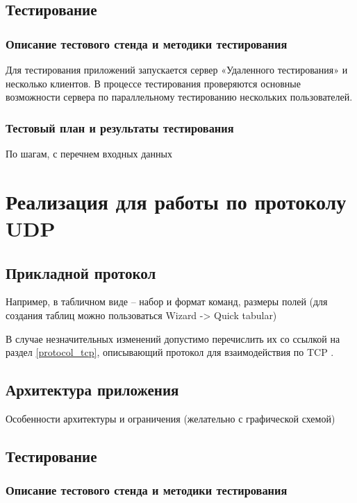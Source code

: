 \documentclass[12pt,a4paper]{report}
\begin{document}
\section{Тестирование}
\subsection{Описание тестового стенда и методики тестирования}
Для тестирования приложений запускается сервер «Удаленного тестирования» и несколько клиентов. В процессе тестирования проверяются основные возможности сервера по параллельному тестированию нескольких пользователей.
\subsection{Тестовый план и результаты тестирования}
По шагам, с перечнем входных данных

\chapter{Реализация для работы по протоколу UDP}
\section{Прикладной протокол}

Например, в табличном виде -- набор и формат команд, размеры полей
(для создания таблиц можно пользоваться Wizard -> Quick tabular)




В случае незначительных изменений допустимо перечислить их со ссылкой на раздел \ref{protocol_tcp}, описывающий протокол для взаимодействия по TCP .

\section{Архитектура приложения}
Особенности архитектуры и ограничения (желательно с графической схемой) 

\section{Тестирование}
\subsection{Описание тестового стенда и методики тестирования}
\end{document}
